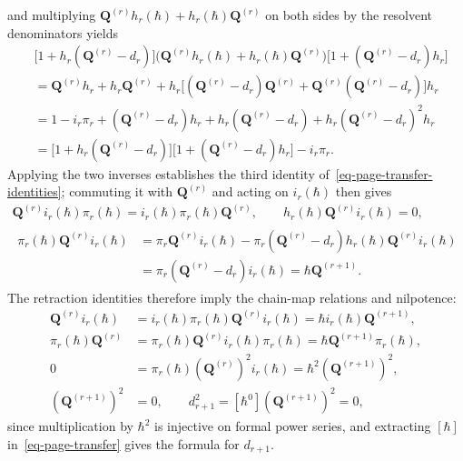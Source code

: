 \documentclass[11pt]{article}
\numberwithin{equation}{section}
\numberwithin{figure}{section}
\numberwithin{table}{section}
\begin{document}
\begin{proofbox}
\begin{equation}
\end{equation}
and multiplying $\mathbf Q^{(r)}h_r(\hbar)+h_r(\hbar)\mathbf Q^{(r)}$ on both sides by the resolvent denominators yields
\begin{equation}\label{eq-ch8-transfer-homotopy-calculation}
\begin{aligned}
&\bigl[1+h_r(\mathbf Q^{(r)}-d_r)\bigr]
\bigl(\mathbf Q^{(r)}h_r(\hbar)+h_r(\hbar)\mathbf Q^{(r)}\bigr)
\bigl[1+(\mathbf Q^{(r)}-d_r)h_r\bigr]\\
&=\mathbf Q^{(r)}h_r+h_r\mathbf Q^{(r)}
+h_r\bigl[(\mathbf Q^{(r)}-d_r)\mathbf Q^{(r)}
+\mathbf Q^{(r)}(\mathbf Q^{(r)}-d_r)\bigr]h_r\\
&=1-i_r\pi_r+(\mathbf Q^{(r)}-d_r)h_r
+h_r(\mathbf Q^{(r)}-d_r)+h_r(\mathbf Q^{(r)}-d_r)^2h_r\\
&=\bigl[1+h_r(\mathbf Q^{(r)}-d_r)\bigr]
\bigl[1+(\mathbf Q^{(r)}-d_r)h_r\bigr]-i_r\pi_r.
\end{aligned}
\end{equation}
Applying the two inverses establishes the third identity of~\eqref{eq-page-transfer-identities}; commuting it with $\mathbf Q^{(r)}$ and acting on $i_r(\hbar)$ then gives
\begin{equation}\label{eq-ch8-transfer-invariance}
\begin{gathered}
\mathbf Q^{(r)}i_r(\hbar)\pi_r(\hbar)
=i_r(\hbar)\pi_r(\hbar)\mathbf Q^{(r)},\qquad
h_r(\hbar)\mathbf Q^{(r)}i_r(\hbar)=0,\\
\begin{aligned}
\pi_r(\hbar)\mathbf Q^{(r)}i_r(\hbar)
&=\pi_r\mathbf Q^{(r)}i_r(\hbar)
-\pi_r(\mathbf Q^{(r)}-d_r)h_r(\hbar)\mathbf Q^{(r)}i_r(\hbar)\\
&=\pi_r(\mathbf Q^{(r)}-d_r)i_r(\hbar)
=\hbar\mathbf Q^{(r+1)}.
\end{aligned}
\end{gathered}
\end{equation}
The retraction identities therefore imply the chain-map relations and nilpotence:
\begin{equation}\label{eq-ch8-transfer-chain-maps-proved}
\begin{aligned}
\mathbf Q^{(r)}i_r(\hbar)
&=i_r(\hbar)\pi_r(\hbar)\mathbf Q^{(r)}i_r(\hbar)
=\hbar i_r(\hbar)\mathbf Q^{(r+1)},\\
\pi_r(\hbar)\mathbf Q^{(r)}
&=\pi_r(\hbar)\mathbf Q^{(r)}i_r(\hbar)\pi_r(\hbar)
=\hbar\mathbf Q^{(r+1)}\pi_r(\hbar),\\
0&=\pi_r(\hbar)(\mathbf Q^{(r)})^2i_r(\hbar)
=\hbar^2(\mathbf Q^{(r+1)})^2,\\
(\mathbf Q^{(r+1)})^2&=0,\qquad
d_{r+1}^2=[\hbar^0](\mathbf Q^{(r+1)})^2=0,
\end{aligned}
\end{equation}
since multiplication by $\hbar^2$ is injective on formal power series, and extracting $[\hbar]$ in~\eqref{eq-page-transfer} gives the formula for $d_{r+1}$.~\hfill\qedsymbol
\end{proofbox}
\end{document}
